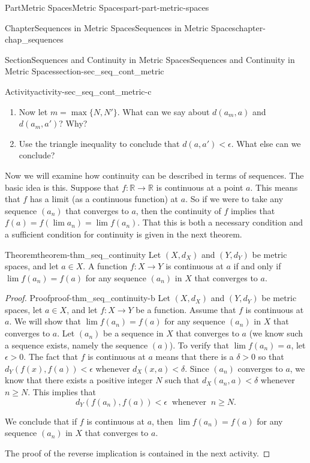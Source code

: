 \documentclass[oneside,10pt,]{book}
\numberwithin{equation}{chapter}
\newcommand{\R}{\mathbb{R}}
\newcommand{\lt}{<}
\newcommand{\gt}{>}
\begin{document}
\begin{partptx}{Part}{Metric Spaces}{}{Metric Spaces}{}{}{part-part-metric-spaces}
\begin{chapterptx}{Chapter}{Sequences in Metric Spaces}{}{Sequences in Metric Spaces}{}{}{chapter-chap_sequences}
\begin{sectionptx}{Section}{Sequences and Continuity in Metric Spaces}{}{Sequences and Continuity in Metric Spaces}{}{}{section-sec_seq_cont_metric}
\begin{activity}{Activity}{}{activity-sec_seq_cont_metric-c}
\begin{enumerate}[font=\bfseries,label=(\alph*),ref=\alph*]
\item{}Now let \(m = \max\{N, N'\}\). What can we say about \(d(a_m,a)\) and \(d(a_m,a')\)? Why?%
\item{}Use the triangle inequality to conclude that \(d(a,a') \lt \epsilon\). What else can we conclude?%
\end{enumerate}%
\end{activity}%
Now we will examine how continuity can be described in terms of sequences. The basic idea is this. Suppose that \(f : \R \to \R\) is continuous at a point \(a\). This means that \(f\) has a limit (as a continuous function) at \(a\). So if we were to take any sequence \((a_n)\) that converges to \(a\), then the continuity of \(f\) implies that \(f(a) = f(\lim a_n) = \lim f(a_n)\). That this is both a necessary condition and a sufficient condition for continuity is given in the next theorem.%
\begin{theorem}{Theorem}{}{}{theorem-thm_seq_continuity}%
Let \((X,d_X)\) and \((Y,d_Y)\) be metric spaces, and let \(a \in X\). A function \(f:X \to Y\) is continuous at \(a\) if and only if \(\lim f(a_n) = f(a)\) for any sequence \((a_n)\) in \(X\) that converges to \(a\).%
\end{theorem}
\begin{proof}{Proof}{}{proof-thm_seq_continuity-b}
Let \((X,d_X)\) and \((Y,d_Y)\) be metric spaces, let \(a \in X\), and let \(f: X \to Y\) be a function. Assume that \(f\) is continuous at \(a\). We will show that \(\lim f(a_n) = f(a)\) for any sequence \((a_n)\) in \(X\) that converges to \(a\). Let \((a_n)\) be a sequence in \(X\) that converges to \(a\) (we know such a sequence exists, namely the sequence \((a)\)). To verify that \(\lim f(a_n) = a\), let \(\epsilon \gt 0\). The fact that \(f\) is continuous at \(a\) means that there is a \(\delta \gt 0\) so that \(d_Y(f(x),
f(a)) \lt  \epsilon\) whenever \(d_X(x,a) \lt  \delta\). Since \((a_n)\) converges to \(a\), we know that there exists a positive integer \(N\) such that \(d_X(a_n, a) \lt  \delta\) whenever \(n \geq N\). This implies that%
\begin{equation*}
d_Y(f(a_n), f(a)) \lt  \epsilon \ \text{ whenever }  \ n \geq N\text{.}
\end{equation*}
%
\par
We conclude that if \(f\) is continuous at \(a\), then \(\lim f(a_n) = f(a)\) for any sequence \((a_n)\) in \(X\) that converges to \(a\).%
\par
The proof of the reverse implication is contained in the next activity.%

\end{proof}
\end{sectionptx}
\end{chapterptx}
\end{partptx}
\end{document}
